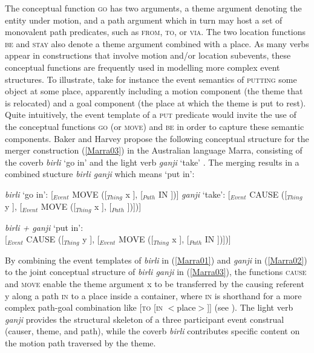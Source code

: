 \smallskip
{\scriptsize
\begin{avm}
\end{avm}
}

\bigskip
The conceptual function \textsc{go} has two arguments, a theme argument denoting the entity under motion, and a path argument which in turn may host a set of monovalent path predicates, such as \textsc{from}, \textsc{to}, or \textsc{via}. The two location functions \textsc{be} and \textsc{stay} also denote a theme argument combined with a place. As many verbs appear in constructions that involve motion and/or location subevents, these conceptual functions are frequently used in modelling more complex event structures. To illustrate, take for instance the event semantics of \textsc{putting} some object at some place, apparently including a motion component (the theme that is relocated) and a goal component (the place at which the theme is put to rest). Quite intuitively, the event template of a \textsc{put} predicate would invite the use of the conceptual functions \textsc{go} (or \textsc{move}) and \textsc{be} in order to capture these semantic components. Baker and Harvey propose the following conceptual structure for the merger construction (\ref{Marra03}) in the Australian language Marra, consisting of the coverb \textit{birli} `go in' and the light verb \textit{ganji} `take' \citep[24f.]{baker2010complex}. The merging results in a combined stucture \textit{birli ganji} which means `put in':

\ea \label{Marra01}
\textit{birli} `go in': {\small[$_{Event}$ MOVE ([$_{Thing}$ x ], [$_{Path}$ IN ])]}
\z
\ea \label{Marra02}
\textit{ganji} `take': {\small[$_{Event}$ CAUSE ([$_{Thing}$ y ], [$_{Event}$ MOVE ([$_{Thing}$ x ], [$_{Path}$ ])])]}
\z

\ea \label{Marra03}
\textit{birli + ganji} `put in': \\
{\small[$_{Event}$ CAUSE ([$_{Thing}$ y ], [$_{Event}$ MOVE ([$_{Thing}$ x ], [$_{Path}$ IN ])])]}
\z

By combining the event templates of \textit{birli} in (\ref{Marra01}) and \textit{ganji} in (\ref{Marra02}) to the joint conceptual structure of \textit{birli ganji} in (\ref{Marra03}), the functions \textsc{cause} and \textsc{move} enable the theme argument x to be transferred by the causing referent y along a path \textsc{in} to a place inside a container, where \textsc{in} is shorthand for a more complex path-goal combination like [\textsc{to} [\textsc{in} $<$place$>$]] (see \citealt[45]{Jackendoff1990}). The light verb \textit{ganji} provides the structural skeleton of a three participant event construal (causer, theme, and path), while the coverb \textit{birli} contributes specific content on the motion path traversed by the theme. 

